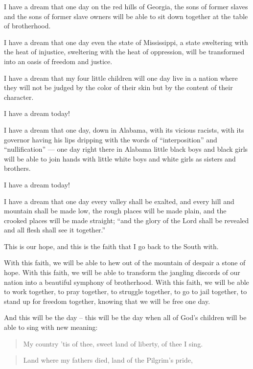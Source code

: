 \documentclass[a4paper]{amsbook}
\begin{document}
I have a dream that one day on the red hills of Georgia, the sons of former slaves and the sons of former slave owners will be able to sit down together at the table of brotherhood.

I have a dream that one day even the state of Mississippi, a state sweltering with the heat of injustice, sweltering with the heat of oppression, will be transformed into an oasis of freedom and justice.

I have a dream that my four little children will one day live in a nation where they will not be judged by the color of their skin but by the content of their character.

I have a dream today!

I have a dream that one day, down in Alabama, with its vicious racists, with its governor having his lips dripping with the words of “interposition” and “nullification” — one day right there in Alabama little black boys and black girls will be able to join hands with little white boys and white girls as sisters and brothers.

I have a dream today!

I have a dream that one day every valley shall be exalted, and every hill and mountain shall be made low, the rough places will be made plain, and the crooked places will be made straight; “and the glory of the Lord shall be revealed and all flesh shall see it together.”

This is our hope, and this is the faith that I go back to the South with.

With this faith, we will be able to hew out of the mountain of despair a stone of hope. With this faith, we will be able to transform the jangling discords of our nation into a beautiful symphony of brotherhood. With this faith, we will be able to work together, to pray together, to struggle together, to go to jail together, to stand up for freedom together, knowing that we will be free one day.

And this will be the day – this will be the day when all of God's children will be able to sing with new meaning:

\begin{quote}My country 'tis of thee, sweet land of liberty, of thee I sing.\end{quote}

\begin{quote}Land where my fathers died, land of the Pilgrim's pride,\end{quote}
\end{document}
